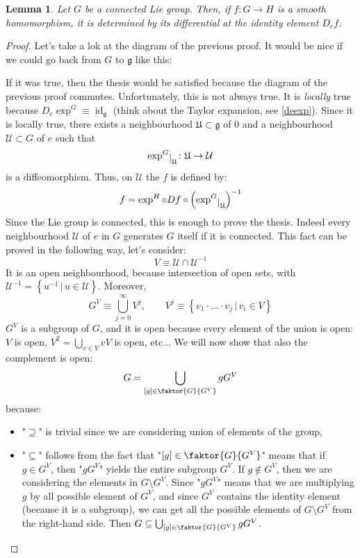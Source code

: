 \documentclass[a4paper,11pt,titlepage, article, oneside]{memoir}
\numberwithin{equation}{section}
\newtheorem{lemma}[theorem]{Lemma}
\theoremstyle{definition}
\theoremstyle{remark}
\DeclareMathOperator{\id}{id}
\newcommand{\lie}[1]{\mathfrak{#1}}
\newcommand{\restrict}[2]{{#1}\raisebox{-.5ex}{$|$}_{#2}}
\begin{document}
\begin{lemma} \label{connliegroup}
Let $G$ be a connected Lie group. Then, if $f \colon G \rightarrow H$ is a smooth homomorphism, it is determined by its differential at the identity element $D_e f$.
\end{lemma}
\begin{proof}
Let's take a lok at the diagram of the previous proof. It would be nice if we could go back from $G$ to $\lie{g}$ like this: 
\begin{center}
\end{center}
If it was true, then the thesis would be satisfied because the diagram of the previous proof commutes. Unfortunately, this is not always true. It is \textit{locally} true because $D_e \exp^G \equiv \id_{\lie{g}}$ (think about the Taylor expansion, see \eqref{deexp}). Since it is locally true, there exists a neighbourhood $\mathfrak{U} \subset \lie{g}$ of 0 and a neighbourhood $\mathcal{U} \subset G$ of $e$ such that 
$$\restrict{\exp^G}{\mathfrak{U}} \colon \mathfrak{U} \rightarrow \mathcal{U}$$
is a diffeomorphism. Thus, on $\mathcal{U}$ the $f$ is defined by:
$$f = \exp^H \circ Df \circ \left(\restrict{\exp^G}{\mathfrak{U}}\right)^{-1}$$
Since the Lie group is connected, this is enough to prove the thesis. Indeed every neighbourhood $\mathcal{U}$ of $e$ in $G$ generates $G$ itself if it is connected. This fact can be proved in the following way, let's consider:
$$V \equiv \mathcal{U} \cap \mathcal{U}^{-1}$$
It is an open neighbourhood, because intersection of open sets, with 
$\mathcal{U}^{-1} = \left \{u^{-1} \, | \, u \in \mathcal{U} \right \}$. Moreover,
$$G^V \equiv \bigcup_{j=0}^{\infty} V^j, \qquad V^j \equiv \left \{v_1 \cdot \ldots \cdot v_j \, | \, v_i \in V \right \}$$
$G^V$ is a subgroup of $G$, and it is open because every element of the union is open: $V$ is open, $V^2 = \bigcup_{v \in V} v V$ is open, etc... We will now show that also the complement is open:
$$G = \bigcup_{[g] \in \faktor{G}{G^V}} g G^V$$ 
because: 
\begin{itemize}
\item "$\supseteq$" is trivial since we are considering union of elements of the group,
\item "$\subseteq$" follows from the fact that "$[g] \in \faktor{G}{G^V}$" means that if $g \in G^V$, then "$gG^V$" yields the entire subgroup $G^V$. If $g \not \in G^V$, then we are considering the elements in $G \setminus G^V$. Since "$g G^V$" means that we are multiplying $g$ by all possible element of $G^V$, and since $G^V$ contains the identity element (because it is a subgroup), we can get all the possible elements of $G \setminus G^V$ from the right-hand side. Then $G \subseteq \bigcup_{[g] \in \faktor{G}{G^V}} g G^V$.

\end{itemize}
\end{proof}
\end{document}
